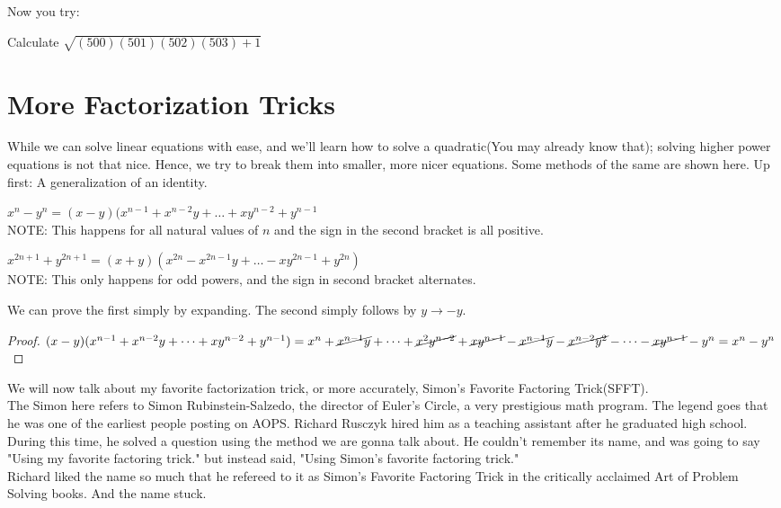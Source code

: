 Now you try:\\
\begin{example}
    Calculate $\sqrt{(500)(501)(502)(503)+1}$
\end{example}
\section{More Factorization Tricks}
While we can solve linear equations with ease, and we'll learn how to solve a quadratic(You may already know that); solving higher power equations is not that nice. Hence, we try to break them into smaller, more nicer equations. Some methods of the same are shown here. Up first: A generalization of an identity.
\begin{theorem}
    $x^n-y^n=(x-y)(x^{n-1}+x^{n-2}y+\dots +xy^{n-2}+y^{n-1}$\\
    NOTE: This happens for all natural values of $n$ and the sign in the second bracket is all positive.
\end{theorem}
\begin{theorem}
    $x^{2n+1}+y^{2n+1}=(x+y)(x^{2n}-x^{2n-1}y+\dots-xy^{2n-1}+y^{2n})$\\
    NOTE: This only happens for odd powers, and the sign in second bracket alternates.
\end{theorem}
We can prove the first simply by expanding. The second simply follows by $y \rightarrow -y$.\\
\begin{proof}
    $(x-y)(x^{n-1}+x^{n-2}y+\dots +xy^{n-2}+y^{n-1})\\
    = x^n+\cancel{x^{n-1}y} + \dots +\cancel{x^2y^{n-2}}+\cancel{xy^{n-1}} - \cancel{x^{n-1}y}-\cancel{x^{n-2}y^2} - \dots -\cancel{xy^{n-1}}-y^n\\
    = x^n-y^n$
\end{proof}
We will now talk about my favorite factorization trick, or more accurately, Simon’s Favorite Factoring Trick(SFFT).\\
The Simon here refers to Simon Rubinstein-Salzedo, the director of Euler's Circle, a very prestigious math program. The legend goes that he was one of the earliest people posting on AOPS. Richard Rusczyk hired him as a teaching assistant after he graduated high school. During this time, he solved a question using the method we are gonna talk about. He couldn't remember its name, and was going to say "Using my favorite factoring trick." but instead said, "Using Simon's favorite factoring trick."\\
Richard liked the name so much that he refereed to it as Simon’s Favorite Factoring Trick in the critically acclaimed Art of Problem Solving books. And the name stuck.\\
